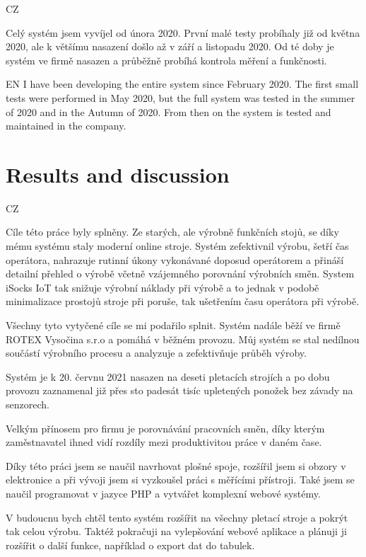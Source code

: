 \documentclass[12pt, a4paper]{article}
\begin{document}
CZ

Celý systém jsem vyvíjel od února 2020.
První malé testy probíhaly již od května 2020, ale k většímu nasazení došlo až v září a listopadu 2020.
Od té doby je systém ve firmě nasazen a průběžně probíhá kontrola měření a funkčnosti.

EN
I have been developing the entire system since February 2020.
The first small tests were performed in May 2020, but the full system was tested in the summer of 2020 and in the Autumn of 2020.
From then on the system is tested and maintained in the company.


\newpage
\section*{Results and discussion}

CZ

Cíle této práce byly splněny. Ze starých, ale výrobně funkčních stojů, se díky mému systému staly moderní online stroje.
Systém zefektivnil výrobu, šetří čas operátora, nahrazuje rutinní úkony vykonávané doposud operátorem a přináší detailní přehled o výrobě včetně vzájemného porovnání výrobních směn.
System iSocks IoT tak snižuje výrobní náklady při výrobě a to jednak v podobě minimalizace prostojů stroje při poruše, tak ušetřením času operátora při výrobě.


Všechny tyto vytyčené cíle se mi podařilo splnit.
Systém nadále běží ve firmě ROTEX Vysočina s.r.o a pomáhá v běžném provozu.
Můj systém se stal nedílnou součástí výrobního procesu a analyzuje a zefektivňuje průběh výroby.

Systém je k 20. červnu 2021 nasazen na deseti pletacích strojích a po dobu provozu zaznamenal již přes sto padesát tisíc upletených ponožek bez závady na senzorech.

Velkým přínosem pro firmu je porovnávání pracovních směn, díky kterým zaměstnavatel ihned vidí rozdíly mezi produktivitou práce v daném čase.

Díky této práci jsem se naučil navrhovat plošné spoje, rozšířil jsem si obzory v elektronice a při vývoji jsem si vyzkoušel práci s měřícími přístroji.
Také jsem se naučil programovat v jazyce PHP a vytvářet komplexní webové systémy.

V budoucnu bych chtěl tento systém rozšířit na všechny pletací stroje a pokrýt tak celou výrobu.
Taktéž pokračuji na vylepšování webové aplikace a plánuji ji rozšířit o další funkce, například o export dat do tabulek.
\end{document}
